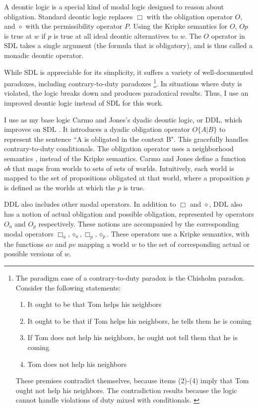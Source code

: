 \begin{isabellebody}
\begin{isamarkuptext}
A deontic logic is a special kind of modal logic designed to reason about obligation. Standard deontic
logic \citep{cresswell, sep-logic-deontic} replaces $\Box$ with the obligation operator
$O$, and $\diamond$ with the permissibility operator $P$. Using the Kripke semantics for $O$, $O p$ 
is true at $w$ if $p$ is true at all  ideal deontic alternatives to $w$. The $O$ operator in SDL
takes a single argument (the formula that is obligatory), and is thus called a monadic deontic operator.

 While SDL is appreciable for its simplicity, it suffers a variety of well-documented paradoxes, 
including contrary-to-duty paradoxes \footnote{The paradigm case of a contrary-to-duty paradox is the 
Chisholm paradox. Consider the following statements: \begin{enumerate}
\item It ought to be that Tom helps his neighbors
\item It ought to be that if Tom helps his neighbors, he tells them he is coming
\item If Tom does not help his neighbors, he ought not tell them that he is coming
\item Tom does not help his neighbors
\end{enumerate} 
These premises contradict themselves, because items (2)-(4) imply that Tom ought not help his neighbors. The 
contradiction results because the logic cannot handle violations of duty mixed with
conditionals. \citep{chisholm, ctd}
}. 
In situations where duty is violated, the logic breaks down 
and produces paradoxical results. Thus, I use an improved deontic logic instead of SDL for this work.%
\end{isamarkuptext}\isamarkuptrue%
%
\begin{isamarkuptext}%
I use as my base logic Carmo and Jones's dyadic deontic logic, or DDL, which improves on SDL \cite{CJDDL}. 
It introduces a dyadic obligation operator $O\{A \vert B\}$ 
to represent the sentence ``A is obligated in the context B". This gracefully handles contrary-to-duty
conditionals. The obligation operator uses a neighborhood semantics \cite{neighborhood1, neighborhood2}, instead of the Kripke semantics. 
Carmo and Jones define a function $ob$ that maps from worlds to sets of sets of worlds. Intuitively, 
each world is mapped to the set of propositions obligated at that world, where a proposition $p$ is defined as 
the worlds at which the $p$ is true.

DDL also includes other modal operators. In addition to $\Box$ and $\diamond$, DDL also has a notion
of actual obligation and possible obligation, represented by operators $O_a$ and $O_p$ respectively. 
These notions are accompanied by the corresponding modal operators $\Box_a, \diamond_a, \Box_p, \diamond_p$. 
These operators use a Kripke semantics, with the functions $av$ and $pv$ mapping a world $w$ to the set 
of corresponding actual or possible versions of $w$. 


\end{isamarkuptext}
\end{isabellebody}
